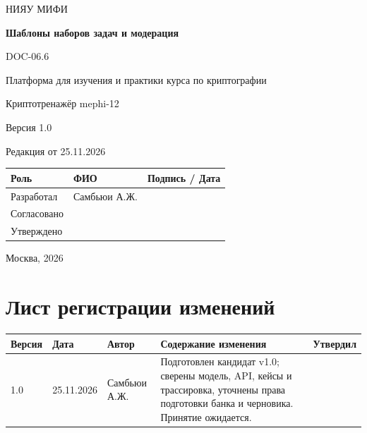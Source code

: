 \documentclass[12pt,a4paper]{article}
\begin{document}
\hypersetup{pageanchor=false}
\begin{titlepage}
  \thispagestyle{empty}
  \centering
  {\large НИЯУ МИФИ\par}
  \vspace*{3.5cm}
  {\LARGE\bfseries Шаблоны наборов задач и модерация\par}
  \vspace{0.5cm}
  {\large DOC-06.6\par}
  \vspace{0.6cm}
  {\large Платформа для изучения и практики курса по криптографии\par}
  {\large Криптотренажёр mephi-12\par}
  \vspace{0.7cm}
  {\large Версия 1.0\par}
  {\large Редакция от 25.11.2026\par}
  \vspace{1cm}
  \begin{tabularx}{\textwidth}{@{}p{3.4cm}Xp{4cm}@{}}
    \toprule
    Роль & ФИО & Подпись / Дата \\
    \midrule
    Разработал & Самбьюи А.Ж. & \\
    \addlinespace[6pt]
    Согласовано & & \\
    \addlinespace[6pt]
    Утверждено & & \\
    \bottomrule
  \end{tabularx}
  \vfill
  {\large Москва, 2026\par}
\end{titlepage}
\hypersetup{pageanchor=true}

\section*{Лист регистрации изменений}
\begingroup\small\singlespacing
\noindent
\begin{tabularx}{\textwidth}{@{}p{1.2cm}p{2cm}p{2.5cm}Xp{1.8cm}@{}}
\toprule
Версия & Дата & Автор & Содержание изменения & Утвердил \\
\midrule
1.0 & 25.11.2026 & Самбьюи А.Ж. & Подготовлен кандидат v1.0; сверены модель, API, кейсы и трассировка, уточнены права подготовки банка и черновика. Принятие ожидается. & \\
\bottomrule
\end{tabularx}
\endgroup
\clearpage
\begingroup\small\singlespacing
\tableofcontents
\endgroup
\clearpage
\end{document}

